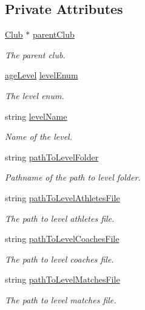 \subsection*{Private Attributes}
\begin{DoxyCompactItemize}
\item 
\hyperlink{class_club}{Club} $\ast$ \hyperlink{class_level_a383670d611a12c518ef48ce9fa179f7a}{parent\+Club}
\begin{DoxyCompactList}\small\item\em The parent club. \end{DoxyCompactList}\item 
\hyperlink{_utils_8hpp_a226b190c54f09ab6ba8ac83b28e3c4b6}{age\+Level} \hyperlink{class_level_a722b6532d70a38fa5f31518761c63012}{level\+Enum}
\begin{DoxyCompactList}\small\item\em The level enum. \end{DoxyCompactList}\item 
string \hyperlink{class_level_aa59964368a47b0d36ff67948b880b3ef}{level\+Name}
\begin{DoxyCompactList}\small\item\em Name of the level. \end{DoxyCompactList}\item 
string \hyperlink{class_level_a2cb769dac86d869787a3a6cd90f32454}{path\+To\+Level\+Folder}
\begin{DoxyCompactList}\small\item\em Pathname of the path to level folder. \end{DoxyCompactList}\item 
string \hyperlink{class_level_a657f004e4174828d48b1a7014536fa50}{path\+To\+Level\+Athletes\+File}
\begin{DoxyCompactList}\small\item\em The path to level athletes file. \end{DoxyCompactList}\item 
string \hyperlink{class_level_a2c43373a0343a66b777d7e879544b5ae}{path\+To\+Level\+Coaches\+File}
\begin{DoxyCompactList}\small\item\em The path to level coaches file. \end{DoxyCompactList}\item 
string \hyperlink{class_level_a295d863ec897640e286b1f9848a36c46}{path\+To\+Level\+Matches\+File}
\begin{DoxyCompactList}\small\item\em The path to level matches file. \end{DoxyCompactList}\item 

\end{DoxyCompactItemize}
